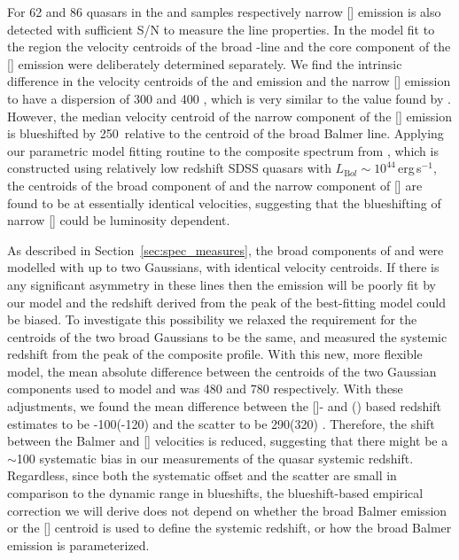 For 62 and 86 quasars in the \ha and \hb samples respectively narrow [] emission is also detected with sufficient S/N to measure the line properties. 
In the model fit to the \hb region the velocity centroids of the broad \hbns-line and the core component of the [] emission were deliberately determined separately.
We find the intrinsic difference in the velocity centroids of the \ha and \hb emission and the narrow [] emission to have a dispersion of 300 and 400 \kms, which is very similar to the value found by \citet{shen16b}. 
However, the median velocity centroid of the narrow component of the [] emission is blueshifted by 250\kms\, relative to the centroid of the broad Balmer line. 
Applying our parametric model fitting routine to the composite spectrum from \citet{hewett10}, which is constructed using relatively low redshift SDSS quasars with $L_{\mathrm Bol}\sim10^{44}$\,erg\,s$^{-1}$, the centroids of the broad component of \hb and the narrow component of [] are found to be at essentially identical velocities, suggesting that the blueshifting of narrow [] could be luminosity dependent.

As described in Section~\ref{sec:spec_measures}, the broad components of \ha and \hb were modelled with up to two Gaussians, with identical velocity centroids. 
If there is any significant asymmetry in these lines then the emission will be poorly fit by our model and the 
redshift derived from the peak of the best-fitting model could be biased. 
To investigate this possibility we relaxed the requirement for the centroids of the two broad Gaussians to be the same, and measured the systemic redshift from the peak of the composite profile. 
With this new, more flexible model, the mean absolute difference between the centroids of the two Gaussian components used to model \ha and \hb was 480 and 780 \kms respectively. 
With these adjustments, we found the mean difference between the []- and \hans(\hbns) based redshift estimates to be -100(-120) \kms and the scatter to be 290(320) \kms. 
Therefore, the shift between the Balmer and [] velocities is reduced, suggesting that there might be a $\sim$100 \kms systematic bias in our measurements of the quasar systemic redshift.  
Regardless, since both the systematic offset and the scatter are small in comparison to the dynamic range in  blueshifts, the blueshift-based empirical correction we will derive does not depend on whether the broad Balmer emission or the [] centroid is used to define the systemic redshift, or how the broad Balmer emission is parameterized. 

